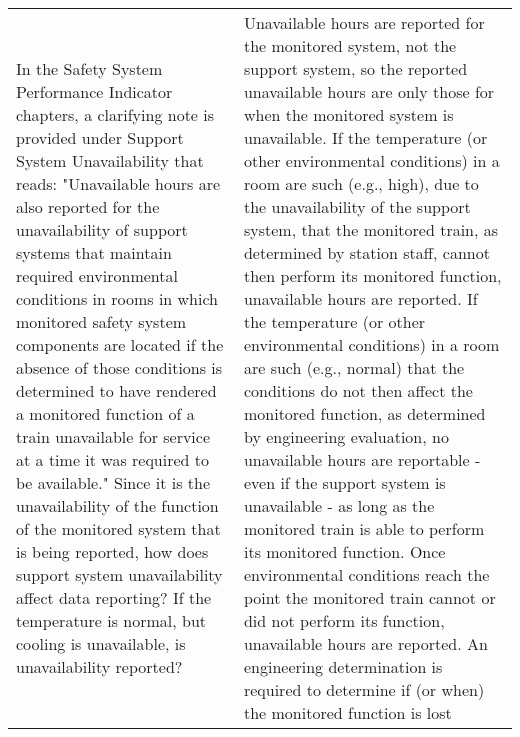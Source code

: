 \begin{longtable}{p{7cm}p{7cm}}
    In the Safety System Performance Indicator chapters, a clarifying
  note is provided under Support System Unavailability that reads:
  "Unavailable hours are also reported for the unavailability of
  support systems that maintain required environmental conditions in
  rooms in which monitored safety system components are located if the
  absence of those conditions is determined to have rendered a
  monitored function of a train unavailable for service at a time it
  was required to be available." Since it is the unavailability of the
  function of the monitored system that is being reported, how does
  support system unavailability affect data reporting? If the
  temperature is normal, but cooling is unavailable, is unavailability
  reported? &
    Unavailable hours are reported for the monitored system, not the
              support system, so the reported unavailable hours are
              only those for when the monitored system is
              unavailable. If the temperature (or other environmental
              conditions) in a room are such (e.g., high), due to the
              unavailability of the support system, that the monitored
              train, as determined by station staff, cannot then
              perform its monitored function, unavailable hours are
              reported. If the temperature (or other environmental
              conditions) in a room are such (e.g., normal) that the
              conditions do not then affect the monitored function, as
              determined by engineering evaluation, no unavailable
              hours are reportable - even if the support system is
              unavailable - as long as the monitored train is able to
              perform its monitored function. Once environmental
              conditions reach the point the monitored train cannot or
              did not perform its function, unavailable hours are
              reported. An engineering determination is required to
              determine if (or when) the monitored function is lost\\


\end{longtable}
